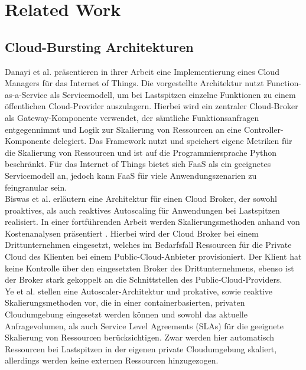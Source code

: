 \documentclass[runningheads]{llncs}
\begin{document}
	
\section{Related Work} \label{work}
	
\subsection{Cloud-Bursting Architekturen}
	
Danayi et al. \cite{danayi_opencot_2019} präsentieren in ihrer Arbeit eine Implementierung eines Cloud Managers für das Internet of Things. Die vorgestellte Architektur nutzt Function-as-a-Service als Servicemodell, um bei Lastspitzen einzelne Funktionen zu einem öffentlichen Cloud-Provider auszulagern. Hierbei wird ein zentraler Cloud-Broker als Gateway-Komponente verwendet, der sämtliche Funktionsanfragen entgegennimmt und Logik zur Skalierung von Ressourcen an eine Controller-Komponente delegiert. Das Framework nutzt und speichert eigene Metriken für die Skalierung von Ressourcen und ist auf die Programmiersprache Python beschränkt. Für das Internet of Things bietet sich FaaS als ein geeignetes Servicemodell an, jedoch kann FaaS für viele Anwendungszenarien zu feingranular sein. \\
	
Biswas et al. \cite{biswas_auto-scaling_2015} erläutern eine Architektur für einen Cloud Broker, der sowohl proaktives, als auch reaktives Autoscaling für Anwendungen bei Lastspitzen realisiert. In einer fortführenden Arbeit werden Skalierungsmethoden anhand von Kostenanalysen präsentiert \cite{biswas_hybrid_2017}. Hierbei wird der Cloud Broker bei einem Drittunternehmen eingesetzt, welches im Bedarfsfall Ressourcen für die Private Cloud des Klienten bei einem Public-Cloud-Anbieter provisioniert. Der Klient hat keine Kontrolle über den eingesetzten Broker des Drittunternehmens, ebenso ist der Broker stark gekoppelt an die Schnittstellen des Public-Cloud-Providers. \\
	
Ye et al. \cite{ye_auto-scaling_2017} stellen eine Autoscaler-Architektur und prokative, sowie reaktive Skalierungsmethoden vor, die in einer containerbasierten, privaten Cloudumgebung eingesetzt werden können und sowohl das aktuelle Anfragevolumen, als auch Service Level Agreements (SLAs) für die geeignete Skalierung von Ressourcen berücksichtigen. Zwar werden hier automatisch Ressourcen bei Lastspitzen in der eigenen private Cloudumgebung skaliert, allerdings werden  keine externen Ressourcen hinzugezogen. \\
	
\end{document}
